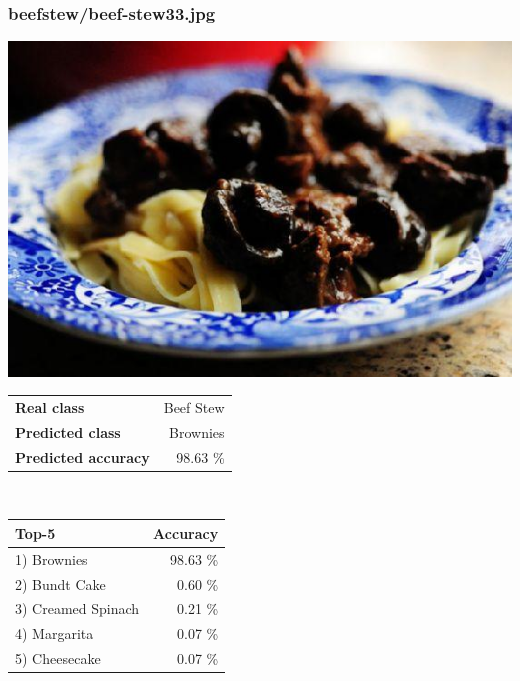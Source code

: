 \subsubsection{beef\textunderscore stew/beef-stew33.jpg}

\begin{minipage}[t]{0.4\textwidth}
	\vspace{0pt}
	\includegraphics[width=\linewidth]{images/evaluation-images/beef_stew/beef-stew33.jpg}
\end{minipage}
\hfill
\begin{minipage}[t]{0.5\textwidth}
	\vspace{0pt}\raggedright
	\begin{tabularx}{\textwidth}{X r}
		\small \textbf{Real class} & \small Beef Stew\\
		\small \textbf{Predicted class} & \small Brownies\\
		\small \textbf{Predicted accuracy} & \small 98.63 \%
    \end{tabularx}\\
    
    \vspace{6pt}
	\begin{tabularx}{\textwidth}{X r}
        \small \textbf{Top-5} & \small \textbf{Accuracy} \\
        \hline
		\small 1) Brownies & \small 98.63 \%\\\small 2) Bundt Cake & \small 0.60 \%\\\small 3) Creamed Spinach & \small 0.21 \%\\\small 4) Margarita & \small 0.07 \%\\\small 5) Cheesecake & \small 0.07 \%
    \end{tabularx}
\end{minipage}
    
